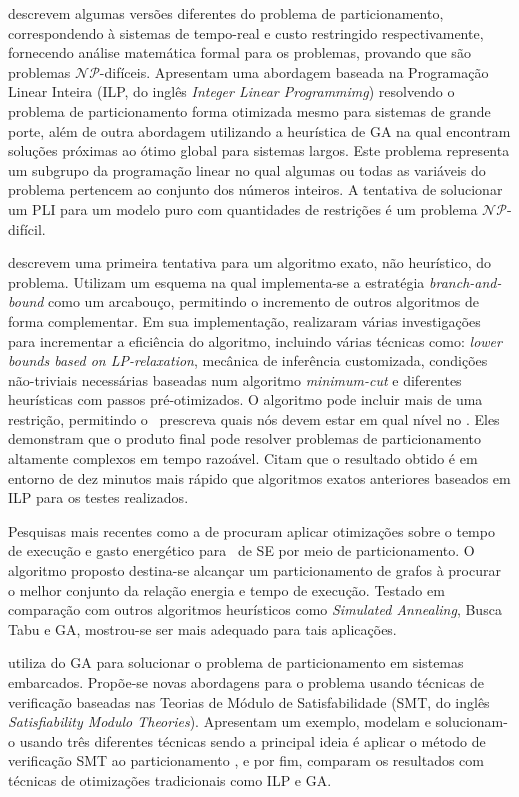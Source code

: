     \citet{Arato2003} descrevem algumas versões diferentes do problema de particionamento, correspondendo à sistemas de tempo-real e custo restringido respectivamente, fornecendo análise matemática formal para os problemas, provando que são problemas $ \mathcal{NP} $-difíceis. 
    Apresentam uma abordagem baseada na Programação Linear Inteira (ILP, do inglês \textit{Integer Linear Programmimg}) resolvendo o problema de particionamento forma otimizada mesmo para sistemas de grande porte, além de outra abordagem utilizando a heurística de GA na qual encontram soluções próximas ao ótimo global para sistemas largos.
    Este problema representa um subgrupo da programação linear no qual algumas ou todas as variáveis do problema pertencem ao conjunto dos números inteiros. A tentativa de solucionar um PLI para um modelo puro com quantidades de restrições é um problema $\mathcal{NP}$-difícil.
    
    
    \citet{Mann2007} descrevem uma primeira tentativa para um algoritmo exato, não heurístico, do problema. 
    Utilizam um esquema na qual implementa-se a estratégia \textit{branch-and-bound} como um arcabouço, permitindo o incremento de outros algoritmos de forma complementar. 
    Em sua implementação, realizaram várias investigações para incrementar a eficiência do algoritmo, incluindo várias técnicas como: \textit{lower bounds based on LP-relaxation}, mecânica de inferência customizada, condições não-triviais necessárias baseadas num algoritmo \textit{minimum-cut} e diferentes heurísticas com passos pré-otimizados. 
    O algoritmo pode incluir mais de uma restrição, permitindo o \designer\ prescreva quais nós devem estar em qual nível no \design. 
    Eles demonstram que o produto final pode resolver problemas de particionamento altamente complexos em tempo razoável. 
    Citam que o resultado obtido é em entorno de dez minutos mais rápido que algoritmos exatos anteriores baseados em ILP para os testes realizados.
    
    Pesquisas mais recentes como a de \citet{BenHajHassine2017} procuram aplicar otimizações sobre o tempo de execução e gasto energético para \cores\ de SE por meio de particionamento.
    O algoritmo proposto destina-se alcançar um particionamento de grafos à procurar o melhor conjunto da relação energia e tempo de execução.
    Testado em comparação com outros algoritmos heurísticos como \textit{Simulated Annealing}, Busca Tabu e GA, mostrou-se ser mais adequado para tais aplicações.
    
    \citet{Trindade2016} utiliza do GA para solucionar o problema de particionamento em sistemas embarcados. 
    Propõe-se novas abordagens para o problema usando técnicas de verificação baseadas nas Teorias de Módulo de Satisfabilidade (SMT, do inglês \textit{Satisfiability Modulo Theories}). 
    Apresentam um exemplo, modelam e solucionam-o usando três diferentes técnicas sendo a principal ideia é aplicar o método de verificação SMT ao particionamento \hs, e por fim, comparam os resultados com técnicas de otimizações tradicionais como ILP e GA.
    
